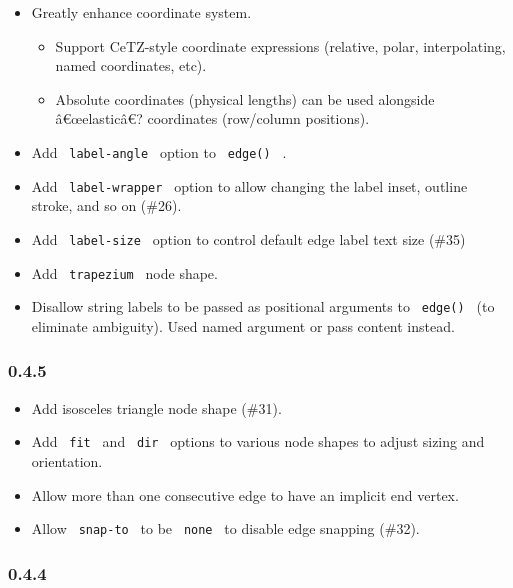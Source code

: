 \begin{itemize}
\tightlist
\item
  Greatly enhance coordinate system.

  \begin{itemize}
  \tightlist
  \item
    Support CeTZ-style coordinate expressions (relative, polar,
    interpolating, named coordinates, etc).
  \item
    Absolute coordinates (physical lengths) can be used alongside
    â€œelasticâ€? coordinates (row/column positions).
  \end{itemize}
\item
  Add \texttt{\ label-angle\ } option to \texttt{\ edge()\ } .
\item
  Add \texttt{\ label-wrapper\ } option to allow changing the label
  inset, outline stroke, and so on (\#26).
\item
  Add \texttt{\ label-size\ } option to control default edge label text
  size (\#35)
\item
  Add \texttt{\ trapezium\ } node shape.
\item
  Disallow string labels to be passed as positional arguments to
  \texttt{\ edge()\ } (to eliminate ambiguity). Used named argument or
  pass content instead.
\end{itemize}

\subsubsection{0.4.5}\label{section-3}

\begin{itemize}
\tightlist
\item
  Add isosceles triangle node shape (\#31).
\item
  Add \texttt{\ fit\ } and \texttt{\ dir\ } options to various node
  shapes to adjust sizing and orientation.
\item
  Allow more than one consecutive edge to have an implicit end vertex.
\item
  Allow \texttt{\ snap-to\ } to be \texttt{\ none\ } to disable edge
  snapping (\#32).
\end{itemize}

\subsubsection{0.4.4}\label{section-4}

